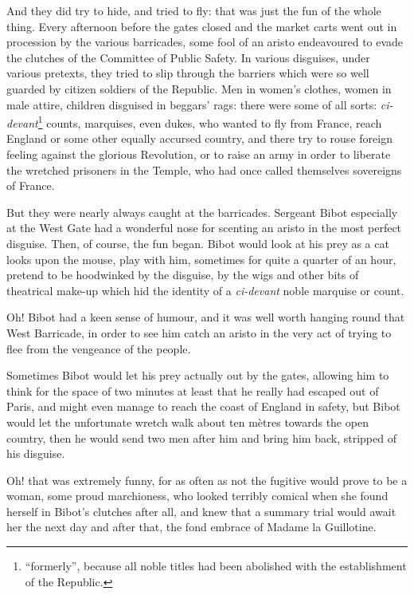 And they did try to hide, and tried to fly: that was just the fun of the whole thing. Every afternoon before the gates closed and the market carts went out in procession by the various barricades, some fool of an aristo endeavoured to evade the clutches of the Committee of Public Safety. In various disguises, under various pretexts, they tried to slip through the barriers which were so well guarded by citizen soldiers of the Republic. Men in women's clothes, women in male attire, children disguised in beggars’ rags: there were some of all sorts: \textit{ci-devant}\footnote{\enquote{formerly}, because all noble titles had been abolished with the establishment of the Republic.} counts, marquises, even dukes, who wanted to fly from France, reach England or some other equally accursed country, and there try to rouse foreign feeling against the glorious Revolution, or to raise an army in order to liberate the wretched prisoners in the Temple, who had once called themselves sovereigns of France.

But they were nearly always caught at the barricades. Sergeant Bibot especially at the West Gate had a wonderful nose for scenting an aristo in the most perfect disguise. Then, of course, the fun began. Bibot would look at his prey as a cat looks upon the mouse, play with him, sometimes for quite a quarter of an hour, pretend to be hoodwinked by the disguise, by the wigs and other bits of theatrical make-up which hid the identity of a \textit{ci-devant} noble marquise or count.

Oh! Bibot had a keen sense of humour, and it was well worth hanging round that West Barricade, in order to see him catch an aristo in the very act of trying to flee from the vengeance of the people.

Sometimes Bibot would let his prey actually out by the gates, allowing him to think for the space of two minutes at least that he really had escaped out of Paris, and might even manage to reach the coast of England in safety, but Bibot would let the unfortunate wretch walk about ten mètres towards the open country, then he would send two men after him and bring him back, stripped of his disguise.

Oh! that was extremely funny, for as often as not the fugitive would prove to be a woman, some proud marchioness, who looked terribly comical when she found herself in Bibot's clutches after all, and knew that a summary trial would await her the next day and after that, the fond embrace of Ma\-dame la Guillotine.

